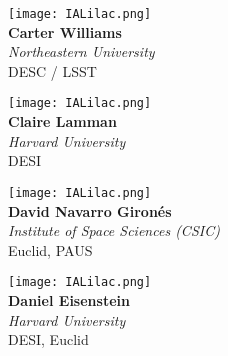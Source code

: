\documentclass[12pt,letterpaper]{article}
\begin{document}
\begin{multicols}{2}
    \begin{minipage}[t][2in][c]{.45\textwidth}
    \centering
    \texttt{[image: IALilac.png]}\\ \vspace{.5cm}
    \Huge \textbf{Carter Williams}\\
    \vspace{0.5cm}
    \Large \textit{Northeastern University} \\
    \vspace{0.5cm}
    \small DESC / LSST
    \end{minipage}
    \vspace{1cm}
    
    \begin{minipage}[t][2in][c]{.45\textwidth}
    \centering
    \texttt{[image: IALilac.png]}\\ \vspace{.5cm}
    \Huge \textbf{Claire Lamman}\\
    \vspace{0.5cm}
    \Large \textit{Harvard University} \\
    \vspace{0.5cm}
    \small DESI
    \end{minipage}
    \vspace{1cm}
    
    \begin{minipage}[t][2in][c]{.45\textwidth}
    \centering
    \texttt{[image: IALilac.png]}\\ \vspace{.5cm}
    \LARGE \textbf{David Navarro Gironés}\\
    \vspace{0.5cm}
    \Large \textit{Institute of Space Sciences (CSIC)} \\
    \vspace{0.5cm}
    \small Euclid, PAUS
    \end{minipage}
    \vspace{1cm}
    
    \begin{minipage}[t][2in][c]{.45\textwidth}
    \centering
    \texttt{[image: IALilac.png]}\\ \vspace{.5cm}
    \huge \textbf{Daniel Eisenstein}\\
    \vspace{0.5cm}
    \Large \textit{Harvard University} \\
    \vspace{0.5cm}
    \small DESI, Euclid
    \end{minipage}
    \vspace{1cm}


\end{multicols}
\end{document}
